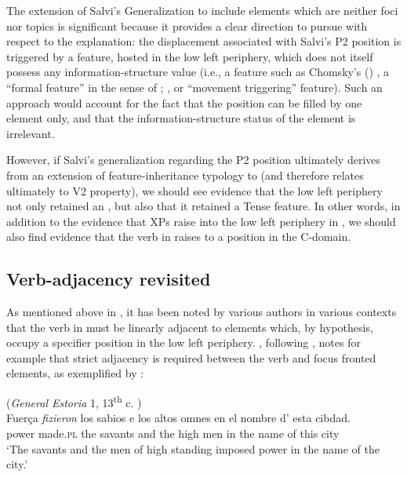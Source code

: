 \documentclass[output=paper]{LSP/langsci}
\begin{document}
The extension of Salvi’s Generalization to include elements which are neither foci nor topics is significant because it provides a clear direction to pursue with respect to the explanation:  the displacement associated with Salvi’s P2 position is triggered by a feature, hosted in the low left periphery, which does not itself possess any information-structure value (i.e., a feature such as Chomsky's (\citeyear{Chomsky2000,Chomsky2001}) , a ``formal feature'' in the sense of \citet{Frey2006}; \citet{Light2012}, or  ``movement triggering'' feature).  Such an approach would account for the fact that the position can be filled by one element only, and that the information-structure status of the element is irrelevant.

However, if Salvi’s generalization regarding the P2 position ultimately derives from an extension of  feature-inheritance typology to  (and therefore relates ultimately to  V2 property), we should see evidence that the low left periphery not only retained an , but also that it retained a Tense feature.  In other words, in addition to the evidence that XPs raise into the low left periphery in , we should also find evidence that the verb in  raises to a position in the C-domain.  

\subsection{Verb-adjacency revisited}\label{sec:poole:3.2}
As mentioned above in , it has been noted by various authors in various contexts that the verb in  must be linearly adjacent to elements which, by hypothesis, occupy a specifier position in the low left periphery.  \citet[175]{Sitaridou2011}, following \citet{Cruschina2008}, notes for example that strict adjacency is required between the verb and focus fronted elements, as exemplified by :

\noindent\parbox{\textwidth}{\ea%
    \label{ex:poole:17}
(\textit{General Estoria} 1, 13\textsuperscript{th} c. \citealt[(23b)]{Sitaridou2011})\\    
    \gll     Fuerça \textit{fizieron} los sabios e los altos omnes en el nombre d’ esta cibdad.  \\
{power} made.\textsc{pl} the savants and the high men in the name of this city	\\
    \glt ‘The savants and the men of high standing imposed power in the name of the city.’
\z}
\end{document}
